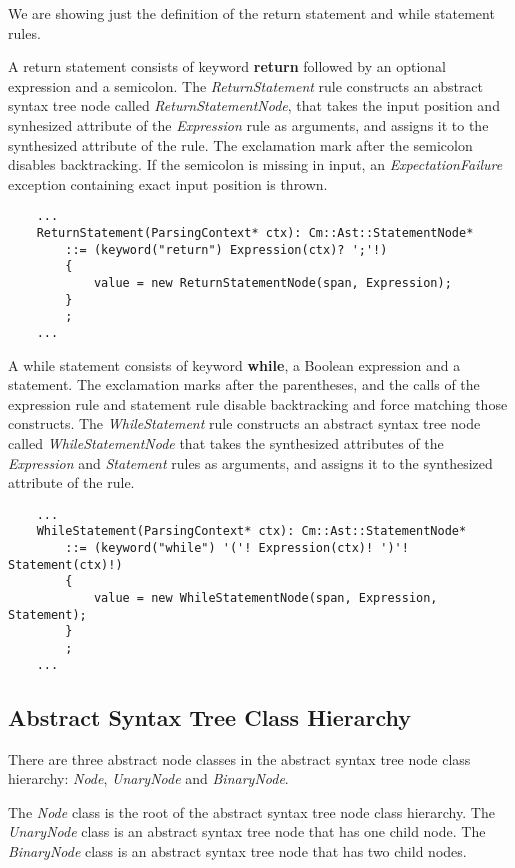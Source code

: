 \documentclass[a4paper,oneside,11pt]{book}
\theoremstyle{definition}
\begin{document}
We are showing just the definition of the return statement and
while statement rules.

A return statement consists of keyword \textbf{return} followed by
an optional expression and a semicolon.
The \emph{ReturnStatement} rule constructs an abstract syntax tree node
called \emph{ReturnStatementNode}, that takes the input position and
synhesized attribute of the \emph{Expression} rule as arguments,
and assigns it to the synthesized attribute of the rule.
The exclamation mark after the semicolon disables backtracking.
If the semicolon is missing in input, an \emph{ExpectationFailure} exception
containing exact input position is thrown.

\lstset{language=cmpg}
\begin{lstlisting}
    ...
    ReturnStatement(ParsingContext* ctx): Cm::Ast::StatementNode*
        ::= (keyword("return") Expression(ctx)? ';'!)
        {
            value = new ReturnStatementNode(span, Expression);
        }
        ;
    ...
\end{lstlisting}

A while statement consists of keyword \textbf{while},
a Boolean expression and a statement.
The exclamation marks after the parentheses, and the calls of the expression rule and
statement rule disable backtracking and force matching those constructs.
The \emph{WhileStatement} rule constructs an abstract syntax tree node called
\emph{WhileStatementNode} that takes the synthesized attributes of the
\emph{Expression} and \emph{Statement} rules as arguments, and
assigns it to the synthesized attribute of the rule.

\lstset{language=cmpg}
\begin{lstlisting}
    ...
    WhileStatement(ParsingContext* ctx): Cm::Ast::StatementNode*
        ::= (keyword("while") '('! Expression(ctx)! ')'! Statement(ctx)!)
        {
            value = new WhileStatementNode(span, Expression, Statement);
        }
        ;
    ...
\end{lstlisting}

\subsection{Abstract Syntax Tree Class Hierarchy}

There are three abstract node classes in the abstract syntax tree node class hierarchy:
\emph{Node}, \emph{UnaryNode} and \emph{BinaryNode}.

The \emph{Node} class is the root of the abstract syntax tree node class hierarchy.
The \emph{UnaryNode} class is an abstract syntax tree node that has one child node.
The \emph{BinaryNode} class is an abstract syntax tree node that has two child nodes.
\end{document}
